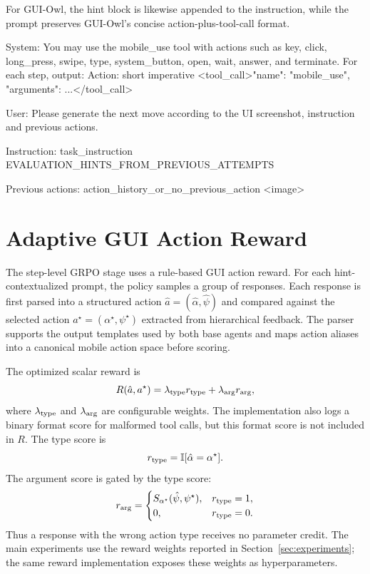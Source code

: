 For GUI-Owl, the hint block is likewise appended to the instruction, while the prompt preserves GUI-Owl's concise action-plus-tool-call format.

\begin{promptlistingbox}
System:
You may use the mobile_use tool with actions such as key, click,
long_press, swipe, type, system_button, open, wait, answer, and
terminate. For each step, output:
  Action: {short imperative}
  <tool_call>{"name": "mobile_use", "arguments": {...}}</tool_call>

User:
Please generate the next move according to the UI screenshot,
instruction and previous actions.

Instruction: {task_instruction}
{EVALUATION_HINTS_FROM_PREVIOUS_ATTEMPTS}

Previous actions:
{action_history_or_no_previous_action}
<image>
\end{promptlistingbox}

\section{Adaptive GUI Action Reward}
\label{sec:appendix_reward}

The step-level GRPO stage uses a rule-based GUI action reward. For each hint-contextualized prompt, the policy samples a group of responses. Each response is first parsed into a structured action $\hat a=(\hat\alpha,\hat\psi)$ and compared against the selected action $a^\star=(\alpha^\star,\psi^\star)$ extracted from hierarchical feedback. The parser supports the output templates used by both base agents and maps action aliases into a canonical mobile action space before scoring.

The optimized scalar reward is
\begin{equation}
\label{eq:appendix_reward}
R(\hat a,a^\star)
=\lambda_{\rm type}r_{\rm type}
+\lambda_{\rm arg}r_{\rm arg},
\end{equation}
where $\lambda_{\rm type}$ and $\lambda_{\rm arg}$ are configurable weights. The implementation also logs a binary format score for malformed tool calls, but this format score is not included in $R$. The type score is
\begin{equation}
\label{eq:appendix_type_reward}
r_{\rm type}=\mathbb{I}[\hat\alpha=\alpha^\star].
\end{equation}
The argument score is gated by the type score:
\begin{equation}
\label{eq:appendix_arg_reward}
r_{\rm arg}=
\begin{cases}
S_{\alpha^\star}(\hat\psi,\psi^\star), & r_{\rm type}=1,\\
0, & r_{\rm type}=0.
\end{cases}
\end{equation}
Thus a response with the wrong action type receives no parameter credit. The main experiments use the reward weights reported in Section~\ref{sec:experiments}; the same reward implementation exposes these weights as hyperparameters.

